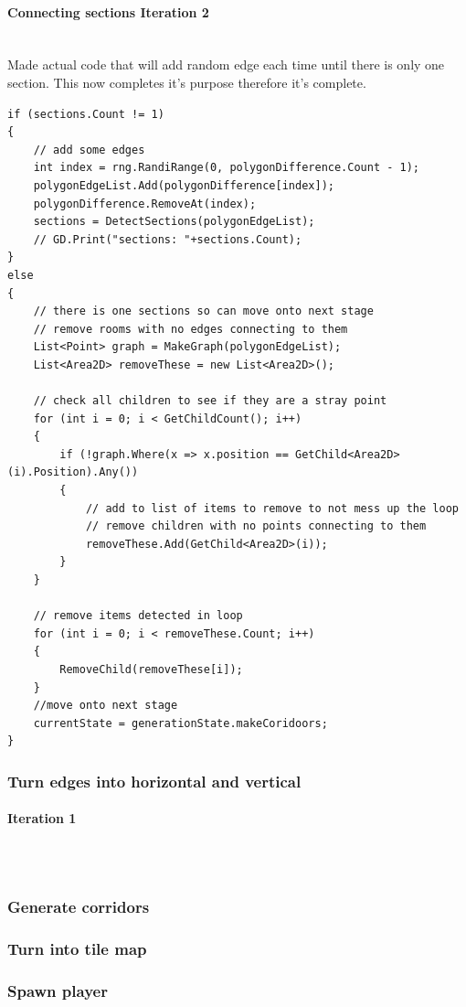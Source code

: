\documentclass{article}
\newcommand{\myparagraph}[1]{\paragraph{#1}\mbox{}\\} %
\begin{document}
\myparagraph{Connecting sections Iteration 2}
Made actual code that will add random edge each time until there is only one section. This now completes it's purpose therefore it's complete.
\begin{lstlisting}
if (sections.Count != 1)
{
    // add some edges
    int index = rng.RandiRange(0, polygonDifference.Count - 1);
    polygonEdgeList.Add(polygonDifference[index]);
    polygonDifference.RemoveAt(index);
    sections = DetectSections(polygonEdgeList);
    // GD.Print("sections: "+sections.Count);
}
else
{
	// there is one sections so can move onto next stage
    // remove rooms with no edges connecting to them
    List<Point> graph = MakeGraph(polygonEdgeList);
    List<Area2D> removeThese = new List<Area2D>();

    // check all children to see if they are a stray point
    for (int i = 0; i < GetChildCount(); i++)
    {
        if (!graph.Where(x => x.position == GetChild<Area2D>(i).Position).Any())
        {
            // add to list of items to remove to not mess up the loop
            // remove children with no points connecting to them
            removeThese.Add(GetChild<Area2D>(i));
        }
    }

    // remove items detected in loop
    for (int i = 0; i < removeThese.Count; i++)
    {
        RemoveChild(removeThese[i]);
    }
	//move onto next stage
    currentState = generationState.makeCoridoors;
}
\end{lstlisting}

\subsubsection{Turn edges into horizontal and vertical}
\myparagraph{Iteration 1}

\begin{lstlisting}

\end{lstlisting}

\subsubsection{Generate corridors}


\subsubsection{Turn into tile map}


\subsubsection{Spawn player}
\end{document}
